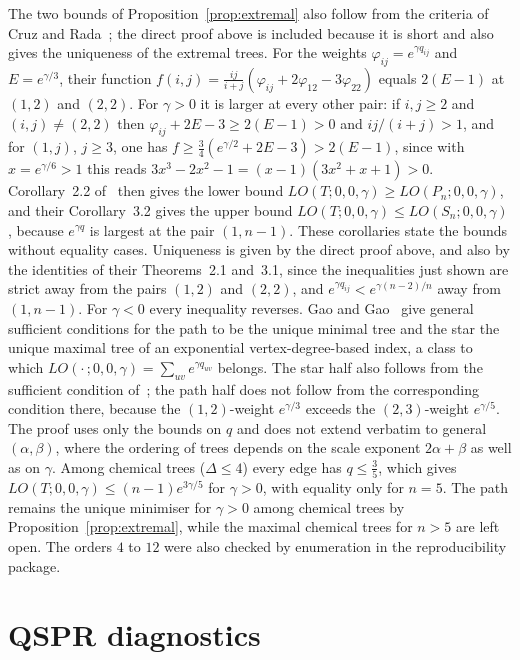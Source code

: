 \documentclass[a5paper, 10pt]{article}
\theoremstyle{plain}
\theoremstyle{remark}
\theoremstyle{definition}
\begin{document}
The two bounds of Proposition~\ref{prop:extremal} also follow from the criteria of Cruz and Rada~\cite{CruzRada2019PathStar}; the direct proof above is included because it is short and also gives the uniqueness of the extremal trees. For the weights $\varphi_{ij} = e^{\gamma q_{ij}}$ and $E = e^{\gamma/3}$, their function $f(i,j) = \tfrac{ij}{i+j}(\varphi_{ij} + 2\varphi_{12} - 3\varphi_{22})$ equals $2(E - 1)$ at $(1,2)$ and $(2,2)$. For $\gamma > 0$ it is larger at every other pair: if $i, j \ge 2$ and $(i,j) \ne (2,2)$ then $\varphi_{ij} + 2E - 3 \ge 2(E-1) > 0$ and $ij/(i+j) > 1$, and for $(1,j)$, $j \ge 3$, one has $f \ge \tfrac34(e^{\gamma/2} + 2E - 3) > 2(E-1)$, since with $x = e^{\gamma/6} > 1$ this reads $3x^3 - 2x^2 - 1 = (x-1)(3x^2 + x + 1) > 0$. Corollary~2.2 of~\cite{CruzRada2019PathStar} then gives the lower bound $LO(T;0,0,\gamma) \ge LO(P_n;0,0,\gamma)$, and their Corollary~3.2 gives the upper bound $LO(T;0,0,\gamma) \le LO(S_n;0,0,\gamma)$, because $e^{\gamma q}$ is largest at the pair $(1,n-1)$. These corollaries state the bounds without equality cases. Uniqueness is given by the direct proof above, and also by the identities of their Theorems~2.1 and~3.1, since the inequalities just shown are strict away from the pairs $(1,2)$ and $(2,2)$, and $e^{\gamma q_{ij}} < e^{\gamma(n-2)/n}$ away from $(1,n-1)$. For $\gamma < 0$ every inequality reverses. Gao and Gao~\cite{GaoAMC2024} give general sufficient conditions for the path to be the unique minimal tree and the star the unique maximal tree of an exponential vertex-degree-based index, a class to which $LO(\cdot\,;0,0,\gamma) = \sum_{uv} e^{\gamma q_{uv}}$ belongs. The star half also follows from the sufficient condition of~\cite[Section~4.2]{Rada2026LinearVDB}; the path half does not follow from the corresponding condition there, because the $(1,2)$-weight $e^{\gamma/3}$ exceeds the $(2,3)$-weight $e^{\gamma/5}$. The proof uses only the bounds on $q$ and does not extend verbatim to general $(\alpha,\beta)$, where the ordering of trees depends on the
scale exponent $2\alpha + \beta$ as well as on $\gamma$. Among
chemical trees ($\Delta \le 4$) every edge has $q \le \tfrac35$, which gives
$LO(T;0,0,\gamma) \le (n-1)e^{3\gamma/5}$ for $\gamma > 0$, with
equality only for $n = 5$. The path remains the unique minimiser for $\gamma > 0$ among chemical trees by Proposition~\ref{prop:extremal}, while the maximal chemical trees for $n > 5$ are left open. The orders $4$ to $12$ were also checked by
enumeration in the reproducibility package.

\section{QSPR diagnostics}\label{sec:sensitivity}
\end{document}
